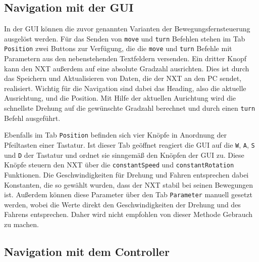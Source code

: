 \documentclass[oneside,abstractoff,a4paper]{scrartcl}
\begin{document}

\subsection{Navigation mit der GUI}

In der GUI können die zuvor genannten Varianten der Bewegungsfernsteuerung ausgelöst werden. Für das Senden von \texttt{move} und \texttt{turn} Befehlen stehen im Tab \texttt{Position} zwei Buttons zur Verfügung, die die \texttt{move} und \texttt{turn} Befehle mit Parametern aus den nebenstehenden Textfeldern versenden. Ein dritter Knopf kann den NXT außerdem auf eine absolute Gradzahl ausrichten. Dies ist durch das Speichern und Aktualisieren von Daten, die der NXT an den PC sendet, realisiert. Wichtig für die Navigation sind dabei das Heading, also die aktuelle Ausrichtung, und die Position. Mit Hilfe der aktuellen Aurichtung wird die schnellste Drehung auf die gewünschte Gradzahl berechnet und durch einen \texttt{turn} Befehl ausgeführt. 

Ebenfalls im Tab \texttt{Position} befinden sich vier Knöpfe in Anordnung der Pfeiltasten einer Tastatur. Ist dieser Tab geöffnet reagiert die GUI auf die \texttt{W}, \texttt{A}, \texttt{S} und \texttt{D} der Tastatur und ordnet sie sinngemäß den Knöpfen der GUI zu.
Diese Knöpfe steuern den NXT über die \texttt{constantSpeed} und \texttt{constantRotation} Funktionen.
Die Geschwindigkeiten für Drehung und Fahren entsprechen dabei Konstanten, die so gewählt wurden, dass der NXT stabil bei seinen Bewegungen ist. Außerdem können diese Parameter über den Tab \texttt{Parameter} manuell gesetzt werden, wobei die Werte direkt den Geschwindigkeiten der Drehung und des Fahrens entsprechen. Daher wird nicht empfohlen von dieser Methode Gebrauch zu machen.

\subsection{Navigation mit dem Controller}
\label{subsec:Controller}
\end{document}
